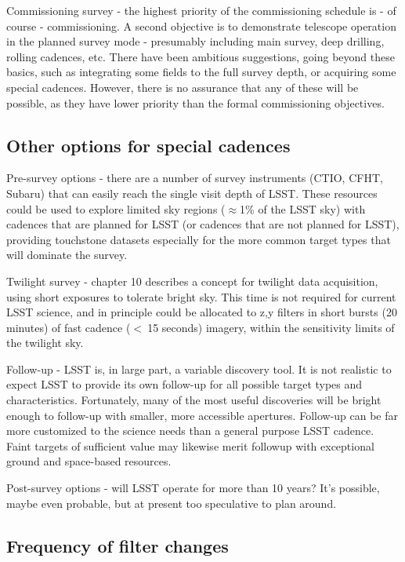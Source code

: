 	Commissioning survey - the highest priority of the commissioning schedule is - of course - commissioning.  A second objective is to demonstrate telescope operation in the planned survey mode - presumably including main survey, deep drilling, rolling cadences, etc.  There have been ambitious suggestions, going beyond these basics, such as integrating some fields to the full survey depth, or acquiring some special cadences.  However, there is no assurance that any of these will be possible, as they have lower priority than the formal commissioning objectives.
	
\subsection{Other options for special cadences}
	
	Pre-survey options - there are a number of survey instruments (CTIO, CFHT, Subaru) that can easily reach the single visit depth of LSST.  These resources could be used to explore limited sky regions ($\approx$1\% of the LSST sky) with cadences that are planned for LSST (or cadences that are not planned for LSST), providing touchstone datasets especially for the more common target types that will dominate the survey.
	
	Twilight survey - chapter 10 describes a concept for twilight data acquisition, using short exposures to tolerate bright sky.  This time is not required for current LSST science, and in principle could be allocated to z,y filters in short bursts (20 minutes) of fast cadence ($<~$15 seconds) imagery, within the sensitivity limits of the twilight sky.
	
	Follow-up - LSST is, in large part, a variable discovery tool.  It is not realistic to expect LSST to provide its own follow-up for all possible target types and characteristics. Fortunately, many of the most useful discoveries will be bright enough to follow-up with smaller, more accessible apertures.  Follow-up can be far more customized to the science needs than a general purpose LSST cadence.  Faint targets of sufficient value may likewise merit followup with exceptional  ground and space-based resources.
	
	Post-survey options - will LSST operate for more than 10 years? It's possible, maybe even probable, but at present too speculative to plan around.


\subsection{Frequency of filter changes}

